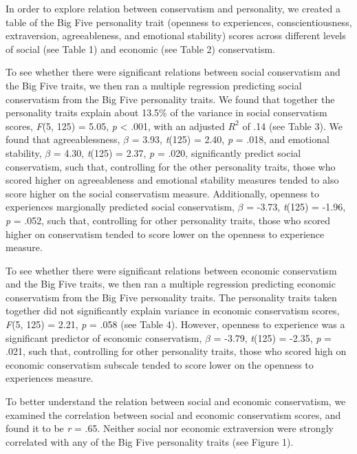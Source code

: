 \documentclass[man]{apa6}
\begin{document}
In order to explore relation between conservatism and personality, we
created a table of the Big Five personality trait (openness to
experiences, conscientiousness, extraversion, agreeableness, and
emotional stability) scores across different levels of social (see Table
1) and economic (see Table 2) conservatism.

To see whether there were significant relations between social
conservatism and the Big Five traits, we then ran a multiple regression
predicting social conservatism from the Big Five personality traits. We
found that together the personality traits explain about 13.5\% of the
variance in social conservatism scores, \emph{F}(5, 125) = 5.05,
\emph{p} \textless{} .001, with an adjusted \(R^2\) of .14 (see Table
3). We found that agreeablessness, \(\beta\) = 3.93, \emph{t}(125) =
2.40, \emph{p} = .018, and emotional stability, \(\beta\) = 4.30,
\emph{t}(125) = 2.37, \emph{p} = .020, significantly predict social
conservatism, such that, controlling for the other personality traits,
those who scored higher on agreeableness and emotional stability
measures tended to also score higher on the social conservatism measure.
Additionally, openness to experiences margionally predicted social
conservatism, \(\beta\) = -3.73, \emph{t}(125) = -1.96, \emph{p} = .052,
such that, controlling for other personality traits, those who scored
higher on conservatism tended to score lower on the openness to
experience measure.

To see whether there were significant relations between economic
conservatism and the Big Five traits, we then ran a multiple regression
predicting economic conservatism from the Big Five personality traits.
The personality traits taken together did not significantly explain
variance in economic conservatism scores, \emph{F}(5, 125) = 2.21,
\emph{p} = .058 (see Table 4). However, openness to experience was a
significant predictor of economic conservatism, \(\beta\) = -3.79,
\emph{t}(125) = -2.35, \emph{p} = .021, such that, controlling for other
personality traits, those who scored high on economic conservatism
subscale tended to score lower on the openness to experiences measure.

To better understand the relation between social and economic
conservatism, we examined the correlation between social and economic
conservatism scores, and found it to be \emph{r} = .65. Neither social
nor economic extraversion were strongly correlated with any of the Big
Five personality traits (see Figure 1).
\end{document}
